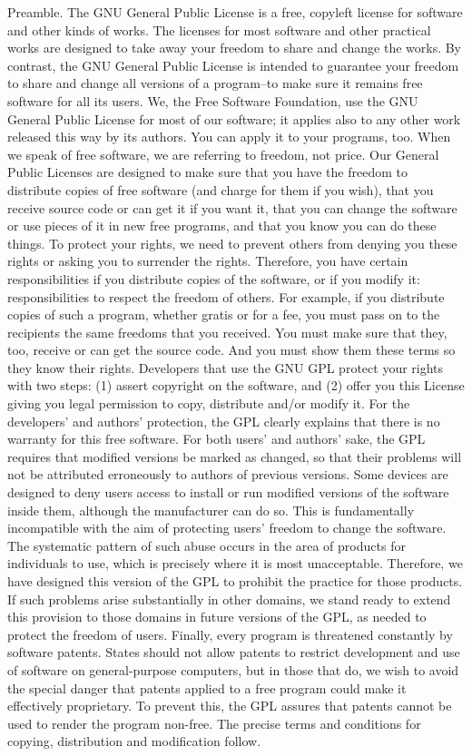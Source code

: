\documentclass {scrbook}
\begin{document}
\begin{tiny}
Preamble. The GNU General Public License is a free, copyleft license for software and other kinds of works. The licenses for most software and other practical works are designed to take away your freedom to share and change the works. By contrast, the GNU General Public License is intended to guarantee your freedom to share and change all versions of a program--to make sure it remains free software for all its users. We, the Free Software Foundation, use the GNU General Public License for most of our software; it applies also to any other work released this way by its authors. You can apply it to your programs, too. When we speak of free software, we are referring to freedom, not price. Our General Public Licenses are designed to make sure that you have the freedom to distribute copies of free software (and charge for them if you wish), that you receive source code or can get it if you want it, that you can change the software or use pieces of it in new free programs, and that you know you can do these things. To protect your rights, we need to prevent others from denying you these rights or asking you to surrender the rights. Therefore, you have certain responsibilities if you distribute copies of the software, or if you modify it: responsibilities to respect the freedom of others. For example, if you distribute copies of such a program, whether gratis or for a fee, you must pass on to the recipients the same freedoms that you received. You must make sure that they, too, receive or can get the source code. And you must show them these terms so they know their rights. Developers that use the GNU GPL protect your rights with two steps: (1) assert copyright on the software, and (2) offer you this License giving you legal permission to copy, distribute and/or modify it. For the developers' and authors' protection, the GPL clearly explains that there is no warranty for this free software. For both users' and authors' sake, the GPL requires that modified versions be marked as changed, so that their problems will not be attributed erroneously to authors of previous versions. Some devices are designed to deny users access to install or run modified versions of the software inside them, although the manufacturer can do so. This is fundamentally incompatible with the aim of protecting users' freedom to change the software. The systematic pattern of such abuse occurs in the area of products for individuals to use, which is precisely where it is most unacceptable. Therefore, we have designed this version of the GPL to prohibit the practice for those products. If such problems arise substantially in other domains, we stand ready to extend this provision to those domains in future versions of the GPL, as needed to protect the freedom of users. Finally, every program is threatened constantly by software patents. States should not allow patents to restrict development and use of software on general-purpose computers, but in those that do, we wish to avoid the special danger that patents applied to a free program could make it effectively proprietary. To prevent this, the GPL assures that patents cannot be used to render the program non-free. The precise terms and conditions for copying, distribution and modification follow.


\end{tiny}
\end{document}
